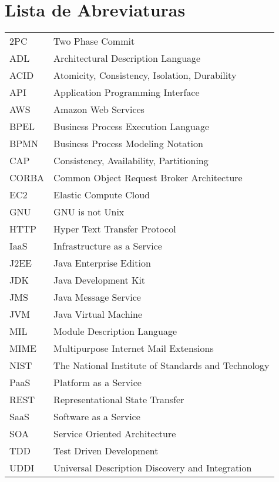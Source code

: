 \documentclass[11pt,twoside,a4paper]{book}
\begin{document}
\chapter{Lista de Abreviaturas}
\begin{tabular}{ll}
         2PC & Two Phase Commit \\
         ADL & Architectural Description Language \\
         ACID & Atomicity, Consistency, Isolation, Durability \\
         API & Application Programming Interface \\
         AWS & Amazon Web Services \\
         BPEL & Business Process Execution Language \\
         BPMN & Business Process Modeling Notation \\
         CAP & Consistency, Availability, Partitioning \\
         CORBA & Common Object Request Broker Architecture \\
         EC2 & Elastic Compute Cloud \\
         GNU & GNU is not Unix \\
         HTTP & Hyper Text Transfer Protocol \\
         IaaS & Infrastructure as a Service \\
         J2EE & Java Enterprise Edition \\
         JDK & Java Development Kit \\
         JMS & Java Message Service \\
         JVM & Java Virtual Machine \\
         MIL & Module Description Language \\
         MIME & Multipurpose Internet Mail Extensions \\
         NIST & The National Institute of Standards and Technology \\
         PaaS & Platform as a Service \\
         REST &  Representational State Transfer \\
         SaaS & Software as a Service \\
         SOA & Service Oriented Architecture \\
         TDD & Test Driven Development \\
         UDDI & Universal Description Discovery and Integration \\

\end{tabular}
\end{document}

